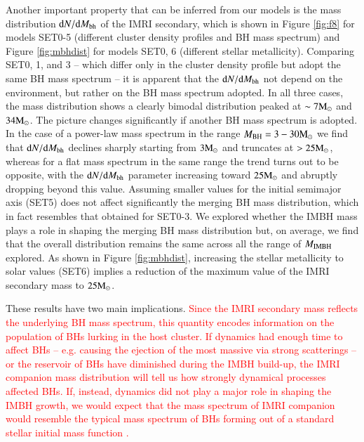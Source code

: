 \documentclass[article]{aa}
\newcommand{\Ms}{{\rm M}_\odot}
\newcommand{\ibh}{{\rm IMBH}}
\newcommand{\bh}{{\rm BH}}
\newcommand{\manuel}{\textcolor{red}}
\begin{document}
{Another important property that can be inferred from our models is the mass distribution ${\rm d}N/{\rm d}M_{\rm bh}$ of the IMRI secondary, which is shown in Figure \ref{fig:f8} for models SET0-5 (different cluster density profiles and BH mass spectrum) and Figure \ref{fig:mbhdist} for models SET0, 6 (different stellar metallicity). Comparing SET0, 1, and 3 -- which differ only in the cluster density profile but adopt the same BH mass spectrum \citep{spera17} -- it is apparent that the ${\rm d}N/{\rm d}M_{\rm bh}$ not depend on the environment, but rather on the BH mass spectrum adopted. In all three cases, the mass distribution shows a clearly bimodal distribution peaked at $\sim 7\Ms$ and $34\Ms$. The picture changes significantly if another BH mass spectrum is adopted. In the case of a power-law mass spectrum in the range $M_\bh = 3-30\Ms$ we find that ${\rm d}N/{\rm d}M_{\rm bh}$ declines sharply starting from $3\Ms$ and truncates at $> 25 \Ms$, whereas for a flat mass spectrum in the same range the trend turns out to be opposite, with the ${\rm d}N/{\rm d}M_{\rm bh}$ parameter increasing toward $25 \Ms$ and abruptly dropping beyond this value. Assuming smaller values for the initial semimajor axis (SET5) does not affect significantly the merging BH mass distribution, which in fact resembles that obtained for SET0-3. We explored whether the IMBH mass plays a role in shaping the merging BH mass distribution but, on average, we find that the overall distribution remains the same across all the range of $M_\ibh$ explored. As shown in Figure \ref{fig:mbhdist}, increasing the stellar metallicity to solar values (SET6) implies a reduction of the maximum value of the IMRI secondary mass to $25\Ms$. 

These results have two main implications. \manuel{
Since the IMRI secondary mass reflects the underlying BH mass spectrum, this quantity 
encodes information on the population of BHs lurking in the host cluster. If dynamics had enough time to affect BHs -- e.g. causing the ejection of the most massive via strong scatterings -- or the reservoir of BHs have diminished during the IMBH build-up, the IMRI companion mass distribution will tell us how strongly dynamical processes affected BHs. If, instead, dynamics did not play a major role in shaping the IMBH growth, we would expect that the mass spectrum of IMRI companion would resemble the typical mass spectrum of BHs forming out of a standard stellar initial mass function \citep[e.g.][]{kroupa01}.}

}
\end{document}
